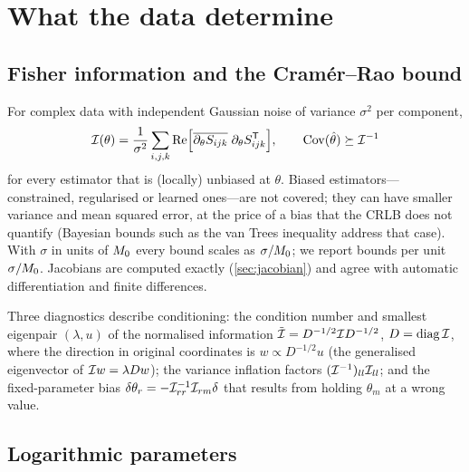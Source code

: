 \section{What the data determine}\label{sec:information}

\subsection{Fisher information and the Cram\'er--Rao bound}

For complex data with independent Gaussian noise of variance $\sigma^2$ per component,
\begin{equation}
  \mathcal{I}(\theta)=\frac{1}{\sigma^2}\sum_{i,j,k}\operatorname{Re}\Bigl[\overline{\partial_\theta S_{ijk}}\;
  \partial_\theta S_{ijk}^{\mathsf T}\Bigr],\qquad
  \operatorname{Cov}(\hat\theta)\succeq\mathcal{I}^{-1}
  \label{eq:fisher}
\end{equation}
for every estimator that is (locally) unbiased at $\theta$. Biased estimators---constrained,
regularised or learned ones---are not covered; they can have smaller variance and mean
squared error, at the price of a bias that the CRLB does not quantify (Bayesian bounds such
as the van Trees inequality address that case). With $\sigma$ in units of $M_0$ every bound
scales as $\sigma/M_0$; we report bounds per unit $\sigma/M_0$. Jacobians are computed exactly
(\cref{sec:jacobian}) and agree with automatic differentiation and finite differences.

Three diagnostics describe conditioning: the condition number and smallest eigenpair
$(\lambda,u)$ of the normalised information $\tilde{\mathcal{I}}=D^{-1/2}\mathcal{I} D^{-1/2}$, $D=\mathrm{diag}\,\mathcal{I}$,
where the direction in original coordinates is $w\propto D^{-1/2}u$ (the generalised eigenvector
of $\mathcal{I} w=\lambda Dw$); the variance inflation factors $(\mathcal{I}^{-1})_{ll}\mathcal{I}_{ll}$; and the
fixed-parameter bias $\delta\theta_r=-\mathcal{I}_{rr}^{-1}\mathcal{I}_{rm}\delta$ that results from holding
$\theta_m$ at a wrong value.

\subsection{Logarithmic parameters}\label{sec:logparam}

